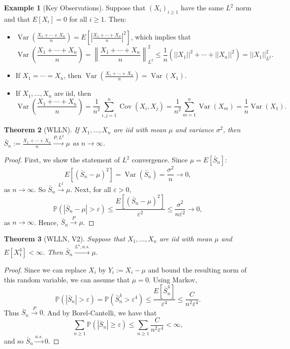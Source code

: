 \documentclass[12pt,reqno]{article}
\theoremstyle{plain}
\newtheorem{theorem}{Theorem}[section]
\theoremstyle{definition}
\newtheorem{example}[theorem]{Example}
\begin{document}
\begin{example}[Key Observations]
Suppose that $(X_i)_{i \geq 1}$ have the same $L^2$ norm and that 
$E[X_i] = 0$ for all $i \geq 1$. Then:
\begin{itemize} 

\item $\operatorname{Var}\left(\frac{X_1+\cdots+X_n}{n}\right) = 
     E\left[\left\lvert \frac{X_1+\cdots+X_n}{n} \right\rvert^2 
     \right]$, which implies that 
     \[
     \operatorname{Var}\left(\frac{X_1+\cdots+X_n}{n}\right) = 
     \left\lVert \frac{X_1+\cdots+X_n}{n} \right\rVert_{L^2}^2 \leq 
     \frac{1}{n}\left(||X_1||^2+\cdots+||X_n||^2\right) = ||X_1||_{L^2}^2. 
     \]
\item If $X_1 = \cdots = X_n$, then 
     $\operatorname{Var}\left(\frac{X_1+\cdots+X_n}{n}\right) = 
     \operatorname{Var}(X_1)$. 
\item If $X_1,\ldots,X_n$ are iid, then 
\[
\operatorname{Var}\left(\frac{X_1+\cdots+X_n}{n}\right) = \frac{1}{n^2} 
     \sum_{i,j=1}^n \operatorname{Cov}(X_i, X_j) = 
     \frac{1}{n^2} \sum_{m=1}^n \operatorname{Var}(X_m) = 
     \frac{1}{n} \operatorname{Var}(X_1).
\]

\end{itemize} 
\end{example} 

\begin{theorem}[WLLN]
If $X_1,\ldots,X_n$ are iid with mean $\mu$ and variance $\sigma^2$, then 
$\bar{S}_n := \frac{X_1+\cdots+X_n}{n} \xrightarrow{P,L^2} \mu$ as 
$n \rightarrow \infty$. 
\end{theorem} 
\begin{proof} 
First, we show the statement of $L^2$ convergence. Since 
$\mu = E[\bar{S}_n]$:
\[
E[(\bar{S}_n-\mu)^2] = \operatorname{Var}(\bar{S}_n) = 
     \frac{\sigma^2}{n} \rightarrow 0, 
\]
as $n \rightarrow \infty$. So $\bar{S}_n \xrightarrow{L^2} \mu$. 
Next, for all $\varepsilon > 0$, 
\[
\mathbb{P}(|\bar{S}_n-\mu| > \varepsilon) \leq 
     \frac{E[(\bar{S}_n-\mu)^2]}{\varepsilon^2} \leq 
     \frac{\sigma^2}{n\varepsilon^2} \longrightarrow 0, 
\]
as $n \rightarrow \infty$. Hence, $\bar{S}_n \xrightarrow{P} \mu$. 
\end{proof} 

\begin{theorem}[WLLN, V2]
Suppose that $X_1,\ldots,X_n$ are iid with mean $\mu$ and 
$E[X_1^4] < \infty$. Then $\bar{S}_n \xrightarrow{L^4,a.s.} \mu$. 
\end{theorem} 
\begin{proof} 
Since we can replace $X_i$ by $Y_i := X_i - \mu$ and bound the resulting 
norm of this random variable, we can assume that $\mu = 0$. Using 
Markov, 
\[
\mathbb{P}(|\bar{S}_n| > \varepsilon) = \mathbb{P}(\bar{S}_n^4 >  
     \varepsilon^4) \leq \frac{E[\bar{S}_n^4]}{\varepsilon^4} \leq 
     \frac{C}{n^2\varepsilon^4}. 
\]
Thus $\bar{S}_n \xrightarrow{P} 0$. And by Borel-Cantelli, we have that 
$$\sum_{n \geq 1} \mathbb{P}(|\bar{S}_n| \geq \varepsilon) \leq 
 \sum_{n \geq 1} \frac{C}{n^2 \varepsilon^4} < \infty,$$ 
and so $\bar{S}_n \xrightarrow{a.s.} 0$. 
\end{proof} 
\end{document}
